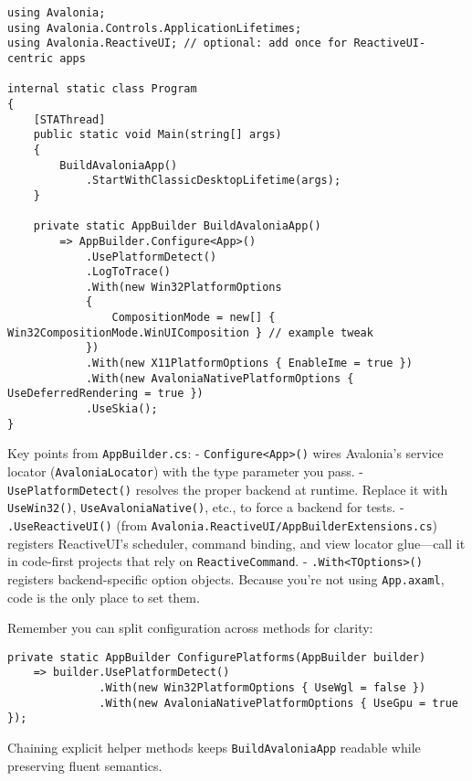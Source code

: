 \begin{lstlisting}
using Avalonia;
using Avalonia.Controls.ApplicationLifetimes;
using Avalonia.ReactiveUI; // optional: add once for ReactiveUI-centric apps

internal static class Program
{
    [STAThread]
    public static void Main(string[] args)
    {
        BuildAvaloniaApp()
            .StartWithClassicDesktopLifetime(args);
    }

    private static AppBuilder BuildAvaloniaApp()
        => AppBuilder.Configure<App>()
            .UsePlatformDetect()
            .LogToTrace()
            .With(new Win32PlatformOptions
            {
                CompositionMode = new[] { Win32CompositionMode.WinUIComposition } // example tweak
            })
            .With(new X11PlatformOptions { EnableIme = true })
            .With(new AvaloniaNativePlatformOptions { UseDeferredRendering = true })
            .UseSkia();
}
\end{lstlisting}

Key points from \passthrough{\lstinline!AppBuilder.cs!}: -
\passthrough{\lstinline!Configure<App>()!} wires Avalonia's service
locator (\passthrough{\lstinline!AvaloniaLocator!}) with the type
parameter you pass. - \passthrough{\lstinline!UsePlatformDetect()!}
resolves the proper backend at runtime. Replace it with
\passthrough{\lstinline!UseWin32()!},
\passthrough{\lstinline!UseAvaloniaNative()!}, etc., to force a backend
for tests. - \passthrough{\lstinline!.UseReactiveUI()!} (from
\passthrough{\lstinline!Avalonia.ReactiveUI/AppBuilderExtensions.cs!})
registers ReactiveUI's scheduler, command binding, and view locator
glue---call it in code-first projects that rely on
\passthrough{\lstinline!ReactiveCommand!}. -
\passthrough{\lstinline!.With<TOptions>()!} registers backend-specific
option objects. Because you're not using
\passthrough{\lstinline!App.axaml!}, code is the only place to set them.

Remember you can split configuration across methods for clarity:

\begin{lstlisting}
private static AppBuilder ConfigurePlatforms(AppBuilder builder)
    => builder.UsePlatformDetect()
              .With(new Win32PlatformOptions { UseWgl = false })
              .With(new AvaloniaNativePlatformOptions { UseGpu = true });
\end{lstlisting}

Chaining explicit helper methods keeps
\passthrough{\lstinline!BuildAvaloniaApp!} readable while preserving
fluent semantics.

